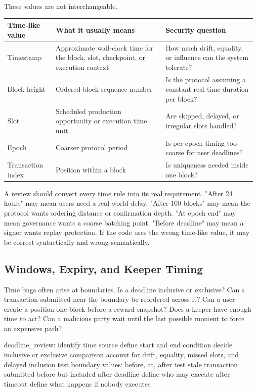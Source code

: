 These values are not interchangeable.

\begin{table}[htbp]
\centering
\small
\renewcommand{\arraystretch}{1.14}
\begin{tabularx}{\textwidth}{@{}>{\RaggedRight\arraybackslash}p{}>{\RaggedRight\arraybackslash}p{}X@{}}
\toprule
Time-like value & What it usually means & Security question \\
\midrule
Timestamp & Approximate wall-clock time for the block, slot, checkpoint, or execution context & How much drift, equality, or influence can the system tolerate? \\
Block height & Ordered block sequence number & Is the protocol assuming a constant real-time duration per block? \\
Slot & Scheduled production opportunity or execution time unit & Are skipped, delayed, or irregular slots handled? \\
Epoch & Coarser protocol period & Is per-epoch timing too coarse for user deadlines? \\
Transaction index & Position within a block & Is uniqueness needed inside one block? \\
\bottomrule
\end{tabularx}
\end{table}

A review should convert every time rule into its real requirement. "After 24 hours" may mean users need a real-world delay. "After 100 blocks" may mean the protocol wants ordering distance or confirmation depth. "At epoch end" may mean governance wants a coarse batching point. "Before deadline" may mean a signer wants replay protection. If the code uses the wrong time-like value, it may be correct syntactically and wrong semantically.

\subsection{Windows, Expiry, and Keeper Timing}

Time bugs often arise at boundaries. Is a deadline inclusive or exclusive? Can a transaction submitted near the boundary be reordered across it? Can a user create a position one block before a reward snapshot? Does a keeper have enough time to act? Can a malicious party wait until the last possible moment to force an expensive path?

\begin{codeblock}
deadline_review:
    identify time source
    define start and end condition
    decide inclusive or exclusive comparison
    account for drift, equality, missed slots, and delayed inclusion
    test boundary values: before, at, after
    test stale transaction submitted before but included after deadline
    define who may execute after timeout
    define what happens if nobody executes
\end{codeblock}

